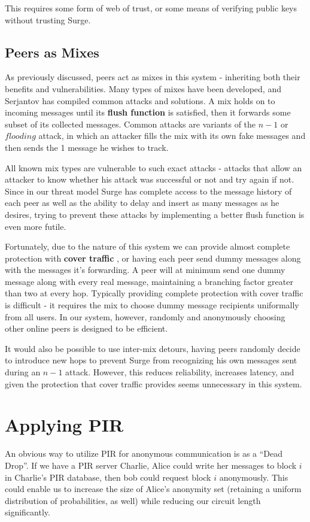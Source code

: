 \documentclass{paper}
\begin{document}
This requires some form of web of trust, or some means of verifying public keys without trusting Surge. 

\subsection{Peers as Mixes}
As previously discussed, peers act as mixes in this system - inheriting both their benefits and vulnerabilities. Many types of mixes have been developed, and Serjantov \cite{trickle02} has compiled common attacks and solutions. 
A mix holds on to incoming messages until its \textbf{flush function} is satisfied, then it forwards some subset of its collected messages. Common attacks are variants of the $n - 1$ or $flooding$ attack, in which an attacker fills the mix with its own fake messages and then sends the 1 message he wishes to track. 

All known mix types are vulnerable to such exact attacks \cite{trickle02} -  attacks that allow an attacker to know whether his attack was successful or not and try again if not. Since in our threat model Surge has complete access to the message history of each peer as well as the ability to delay and insert as many messages as he desires, trying to prevent these attacks by implementing a better flush function is even more futile. 

Fortunately, due to the nature of this system we can provide almost complete protection with \textbf{cover traffic} \cite{trickle02}, or having each peer send dummy messages along with the messages it's forwarding. A peer will at minimum send one dummy message along with every real message, maintaining a branching factor greater than two at every hop. Typically providing complete protection with cover traffic is difficult - it requires the mix to choose dummy message recipients uniformally from all users. In our system, however, randomly and anonymously choosing other online peers is designed to be efficient.

It would also be possible to use inter-mix detours\cite{TODO}, having peers randomly decide to introduce new hops to prevent Surge from recognizing his own messages sent during an $n - 1$ attack. However, this reduces reliability, increases latency, and given the protection that cover traffic provides seems unnecessary in this system. 

\section{Applying PIR}
An obvious way to utilize PIR for anonymous communication is as a ``Dead Drop''. If we have a PIR server Charlie, Alice could write her messages to block $i$ in Charlie's PIR database, then bob could request block $i$ anonymously. This could enable us to increase the size of Alice's anonymity set (retaining a uniform distribution of probabilities, as well) while reducing our circuit length significantly. 
\end{document}

